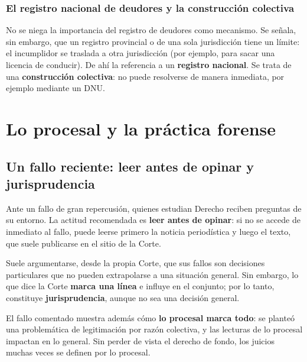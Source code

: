 \documentclass[12pt,oneside]{book}
\begin{document}
\subsection{El registro nacional de deudores y la construcción colectiva}

No se niega la importancia del registro de deudores como mecanismo. Se señala, sin embargo, que un registro provincial o de una sola jurisdicción tiene un límite: el incumplidor se traslada a otra jurisdicción (por ejemplo, para sacar una licencia de conducir). De ahí la referencia a un \textbf{registro nacional}. Se trata de una \textbf{construcción colectiva}: no puede resolverse de manera inmediata, por ejemplo mediante un DNU.


\chapter{Lo procesal y la práctica forense}

\section{Un fallo reciente: leer antes de opinar y jurisprudencia}

Ante un fallo de gran repercusión, quienes estudian Derecho reciben preguntas de su entorno. La actitud recomendada es \textbf{leer antes de opinar}: si no se accede de inmediato al fallo, puede leerse primero la noticia periodística y luego el texto, que suele publicarse en el sitio de la Corte.

Suele argumentarse, desde la propia Corte, que sus fallos son decisiones particulares que no pueden extrapolarse a una situación general. Sin embargo, lo que dice la Corte \textbf{marca una línea} e influye en el conjunto; por lo tanto, constituye \textbf{jurisprudencia}, aunque no sea una decisión general.

El fallo comentado muestra además cómo \textbf{lo procesal marca todo}: se planteó una problemática de legitimación por razón colectiva, y las lecturas de lo procesal impactan en lo general. Sin perder de vista el derecho de fondo, los juicios muchas veces se definen por lo procesal.

\end{document}
